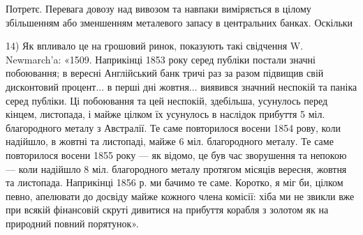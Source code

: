 Потретє. Перевага довозу над вивозом та навпаки виміряється в цілому
збільшенням або зменшенням металевого запасу в центральних банках. Оскільки

14) Як впливало це на грошовий ринок, показують такі свідчення W. Newmarch’a: «1509.
Наприкінці 1853 року серед публіки постали значні побоювання; в вересні Англійський банк тричі
раз за разом підвищив свій дисконтовий процент... в перші дні жовтня... виявився значний неспокій
та паніка серед публіки. Ці побоювання та цей неспокій, здебільша, усунулось перед кінцем,
листопада, і майже цілком їх усунулось в наслідок прибуття 5 міл. благородного металу з Австралії.
Те саме повторилося восени 1854 рову, коли надійшло, в жовтні та листопаді, майже 6 міл.
благородного металу. Те саме повторилося восени 1855 року — як відомо, це був час зворушення та
непокою — коли надійшло 8 міл. благородного металу протягом місяців вересня, жовтня та листопада.
Наприкінці 1856 р. ми бачимо те саме. Коротко, я міг би, цілком певно, апелювати до досвіду майже
кожного члена комісії: хіба ми не звикли вже при всякій фінансовій скруті дивитися на прибуття
корабля з золотом як на природний повний порятунок».
\parbreak{}  %
